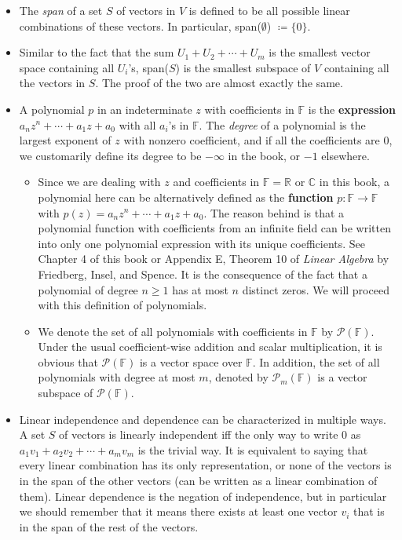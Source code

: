 \documentclass{article}
\newcommand{\R}{\mathbb{R}}
\newcommand{\C}{\mathbb{C}}
\newcommand{\F}{\mathbb{F}}
\begin{document}
\begin{itemize}
    \item The \textit{span} of a set $S$ of vectors in $V$ is defined to be all possible linear combinations of these vectors. In particular, span($\emptyset$) $\coloneqq \{0\}$.
    \item Similar to the fact that the sum $U_1 + U_2 +\cdots+ U_m$ is the smallest vector space containing all $U_i$'s, span($S$) is the smallest subspace of $V$ containing all the vectors in $S$. The proof of the two are almost exactly the same.
    \item A polynomial $p$ in an indeterminate $z$ with coefficients in $\F$ is the \textbf{expression} $a_n z^n + \cdots + a_1 z + a_0$ with all $a_i$'s in $\F$. The \textit{degree} of a polynomial is the largest exponent of $z$ with nonzero coefficient, and if all the coefficients are 0, we customarily define its degree to be $-\infty$ in the book, or $-1$ elsewhere.
    \begin{itemize}
        \item Since we are dealing with $z$ and coefficients in $\F = \R$ or $\C$ in this book, a polynomial here can be alternatively defined as the \textbf{function} $p: \F \rightarrow \F$ with $p(z) = a_n z^n + \cdots + a_1 z + a_0$. The reason behind is that a polynomial function with coefficients from an infinite field can be written into only one polynomial expression with its unique coefficients. See Chapter 4 of this book or Appendix E, Theorem 10 of \textit{Linear Algebra} by Friedberg, Insel, and Spence. It is the consequence of the fact that a polynomial of degree $n \geq 1$ has at most $n$ distinct zeros. We will proceed with this definition of polynomials.
        \item We denote the set of all polynomials with coefficients in $\F$ by $\mathcal{P}(\F)$. Under the usual coefficient-wise addition and scalar multiplication, it is obvious that $\mathcal{P}(\F)$ is a vector space over $\F$. In addition, the set of all polynomials with degree at most $m$, denoted by $\mathcal{P}_m(\F)$ is a vector subspace of $\mathcal{P}(\F)$.
    \end{itemize}
    \item Linear independence and dependence can be characterized in multiple ways. A set $S$ of vectors is linearly independent iff the only way to write 0 as $a_1v_1 + a_2v_2 + \cdots +a_mv_m$ is the trivial way. It is equivalent to saying that every linear combination has its only representation, or none of the vectors is in the span of the other vectors (can be written as a linear combination of them). Linear dependence is the negation of independence, but in particular we should remember that it means there exists at least one vector $v_i$ that is in the span of the rest of the vectors.

\end{itemize}
\end{document}
